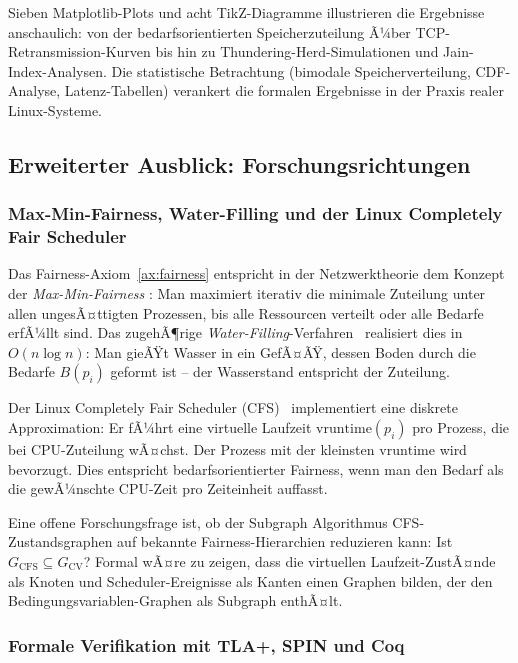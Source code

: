 ﻿\documentclass[a4paper,12pt]{article}
\theoremstyle{definition}
\begin{document}
Sieben Matplotlib-Plots und acht TikZ-Diagramme illustrieren
die Ergebnisse anschaulich: von der bedarfsorientierten
Speicherzuteilung Ã¼ber TCP-Retransmission-Kurven bis hin
zu Thundering-Herd-Simulationen und Jain-Index-Analysen.
Die statistische Betrachtung (bimodale Speicherverteilung,
CDF-Analyse, Latenz-Tabellen) verankert die formalen
Ergebnisse in der Praxis realer Linux-Systeme.

\subsection{Erweiterter Ausblick: Forschungsrichtungen}

\subsubsection{Max-Min-Fairness, Water-Filling und der
Linux Completely Fair Scheduler}

Das Fairness-Axiom~\ref{ax:fairness} entspricht in der
Netzwerktheorie dem Konzept der \emph{Max-Min-Fairness}
\cite{bertsekas1992data}: Man maximiert iterativ die minimale
Zuteilung unter allen ungesÃ¤ttigten Prozessen, bis alle
Ressourcen verteilt oder alle Bedarfe erfÃ¼llt sind.
Das zugehÃ¶rige \emph{Water-Filling}-Verfahren~\cite{cover2006elements}
realisiert dies in $O(n \log n)$: Man gieÃŸt Wasser in ein
GefÃ¤ÃŸ, dessen Boden durch die Bedarfe $B(p_i)$ geformt ist --
der Wasserstand entspricht der Zuteilung.

Der Linux Completely Fair Scheduler (CFS)~\cite{molnar2007cfs}
implementiert eine diskrete Approximation: Er fÃ¼hrt eine
virtuelle Laufzeit $\mathrm{vruntime}(p_i)$ pro Prozess,
die bei CPU-Zuteilung wÃ¤chst. Der Prozess mit der kleinsten
$\mathrm{vruntime}$ wird bevorzugt. Dies entspricht
bedarfsorientierter Fairness, wenn man den Bedarf als
die gewÃ¼nschte CPU-Zeit pro Zeiteinheit auffasst.

Eine offene Forschungsfrage ist, ob der Subgraph Algorithmus
CFS-Zustandsgraphen auf bekannte Fairness-Hierarchien
reduzieren kann: Ist $G_{\mathrm{CFS}} \subseteq G_{\mathrm{CV}}$?
Formal wÃ¤re zu zeigen, dass die virtuellen Laufzeit-ZustÃ¤nde
als Knoten und Scheduler-Ereignisse als Kanten einen Graphen
bilden, der den Bedingungsvariablen-Graphen als Subgraph enthÃ¤lt.

\subsubsection{Formale Verifikation mit TLA+, SPIN und Coq}
\end{document}
